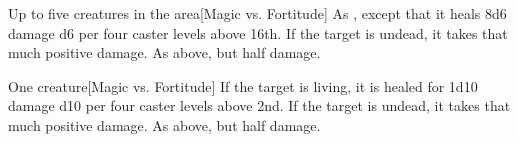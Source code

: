 \begin{spellheader}
    \spellrng{\rngclose}
\end{spellheader}
\begin{spelleffects}
    \begin{spelltargets}{Up to five creatures in the area}[Magic vs. Fortitude]
        \spelleffect As , except that it heals 8d6 damage \add d6 per four caster levels above 16th.
        \spellsuccess If the target is undead, it takes that much positive damage.
        \spellfailure As above, but half damage.
    \end{spelltargets}
\end{spelleffects}
\begin{spellfooter}
    
\end{spellfooter}

\begin{spellheader}
    \spellrng{\rngclose}
\end{spellheader}
\begin{spelleffects}
    \begin{spelltarget}{One creature}[Magic vs. Fortitude]
        \spelleffect If the target is living, it is healed for 1d10 damage \add d10 per four caster levels above 2nd.
        \spellsuccess If the target is undead, it takes that much positive damage.
        \spellfailure As above, but half damage.
    \end{spelltarget}
\end{spelleffects}
\begin{spellfooter}
    
\end{spellfooter}


